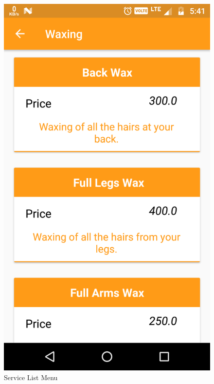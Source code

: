\\
\begin{figure}[h]
	\centering
	\includegraphics[width=0.7\linewidth]{ServiceListMenu}
	\caption{Service List Menu}
\end{figure}
\pagebreak


